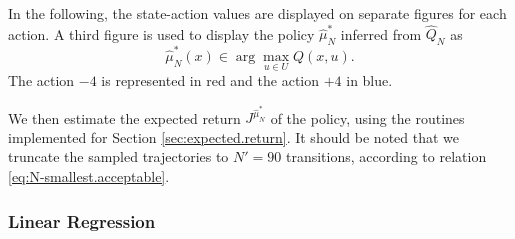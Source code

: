 \documentclass[a4paper, 12pt]{article}
\begin{document}
    In the following, the state-action values are displayed on separate figures for each action. A third figure is used to display the policy $\hat{\mu}^*_N$ inferred from $\hat{Q}_N$ as
    \begin{equation}\label{eq:mu.derived}
        \hat{\mu}^*_N(x) \in \arg\max_{u \in U} Q(x, u) .
    \end{equation}
    The action $-4$ is represented in red and the action $+4$ in blue.
    
    We then estimate the expected return $J^{\hat{\mu}^*_N}$ of the policy, using the routines implemented for Section \ref{sec:expected.return}. It should be noted that we truncate the sampled trajectories to $N' = 90$ transitions, according to relation \eqref{eq:N-smallest.acceptable}.
    
    
    \newpage
    
    \subsubsection{Linear Regression}
    
\end{document}
